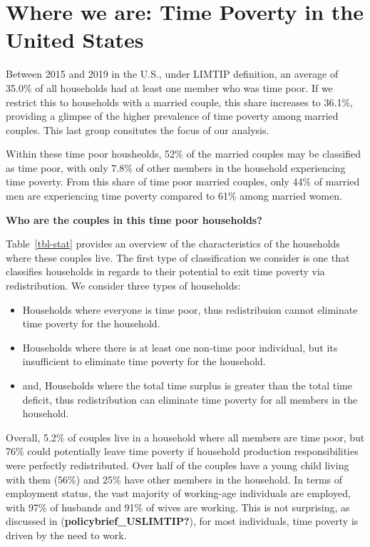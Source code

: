 \documentclass[
  11pt,
]{article}
\providecommand{\tightlist}{%
  \setlength{\itemsep}{0pt}\setlength{\parskip}{0pt}}\usepackage{longtable,booktabs,array}
\begin{document}
\section{Where we are: Time Poverty in the United
States}\label{where-we-are-time-poverty-in-the-united-states}

Between 2015 and 2019 in the U.S., under LIMTIP definition, an average
of 35.0\% of all households had at least one member who was time poor.
If we restrict this to households with a married couple, this share
increases to 36.1\%, providing a glimpse of the higher prevalence of
time poverty among married couples. This last group consitutes the focus
of our analysis.

Within these time poor housheolds, 52\% of the married couples may be
classified as time poor, with only 7.8\% of other members in the
household experiencing time poverty. From this share of time poor
married couples, only 44\% of married men are experiencing time poverty
compared to 61\% among married women.

\textbf{Who are the couples in this time poor households?}

Table~\ref{tbl-stat} provides an overview of the characteristics of the
households where these couples live. The first type of classification we
consider is one that classifies households in regards to their potential
to exit time poverty via redistribution. We consider three types of
households:

\begin{itemize}
\tightlist
\item
  Households where everyone is time poor, thus redistribuion cannot
  eliminate time poverty for the household.
\item
  Households where there is at least one non-time poor individual, but
  its insufficient to eliminate time poverty for the household.
\item
  and, Households where the total time surplus is greater than the total
  time deficit, thus redistribution can eliminate time poverty for all
  members in the household.
\end{itemize}

Overall, 5.2\% of couples live in a household where all members are time
poor, but 76\% could potentially leave time poverty if household
production responsibilities were perfectly redistributed. Over half of
the couples have a young child living with them (56\%) and 25\% have
other members in the household. In terms of employment status, the vast
majority of working-age individuals are employed, with 97\% of husbands
and 91\% of wives are working. This is not surprising, as discussed in
(\textbf{policybrief\_USLIMTIP?}), for most individuals, time poverty is
driven by the need to work.
\end{document}
